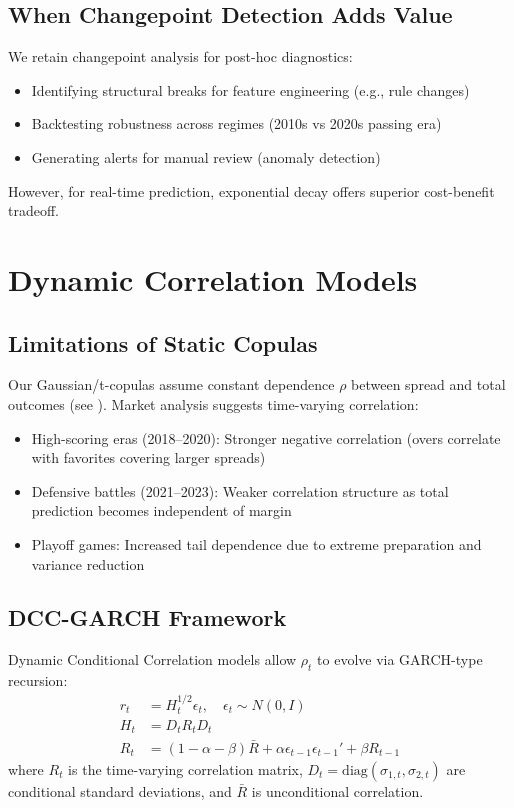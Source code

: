 \subsection{When Changepoint Detection Adds Value}
We retain changepoint analysis for post-hoc diagnostics:
\begin{itemize}
  \item Identifying structural breaks for feature engineering (e.g., rule changes)
  \item Backtesting robustness across regimes (2010s vs 2020s passing era)
  \item Generating alerts for manual review (anomaly detection)
\end{itemize}

However, for real-time prediction, exponential decay offers superior cost-benefit tradeoff.

\section{Dynamic Correlation Models}

\subsection{Limitations of Static Copulas}
Our Gaussian/t-copulas assume constant dependence $\rho$ between spread and total outcomes (see ). Market analysis suggests time-varying correlation:
\begin{itemize}
  \item High-scoring eras (2018--2020): Stronger negative correlation (overs correlate with favorites covering larger spreads)
  \item Defensive battles (2021--2023): Weaker correlation structure as total prediction becomes independent of margin
  \item Playoff games: Increased tail dependence due to extreme preparation and variance reduction
\end{itemize}

\subsection{DCC-GARCH Framework}
Dynamic Conditional Correlation models allow $\rho_t$ to evolve via GARCH-type recursion:
\begin{align}
r_t &= H_t^{1/2} \epsilon_t, \quad \epsilon_t \sim N(0, I) \\
H_t &= D_t R_t D_t \\
R_t &= (1-\alpha-\beta)\bar{R} + \alpha \epsilon_{t-1}\epsilon_{t-1}' + \beta R_{t-1}
\end{align}
where $R_t$ is the time-varying correlation matrix, $D_t = \text{diag}(\sigma_{1,t}, \sigma_{2,t})$ are conditional standard deviations, and $\bar{R}$ is unconditional correlation.

